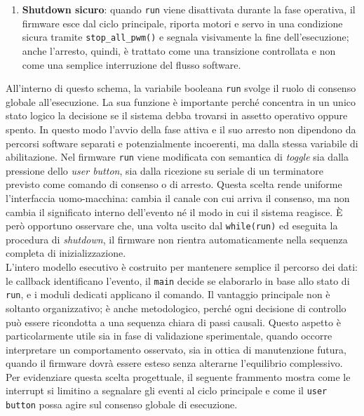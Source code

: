 \documentclass[11pt]{report}
\begin{document}
\begin{enumerate}
		\item \textbf{Shutdown sicuro}: quando \texttt{run} viene disattivata durante la fase operativa, il firmware esce dal ciclo principale, riporta motori e servo in una condizione sicura tramite \texttt{stop\_all\_pwm()} e segnala visivamente la fine dell'esecuzione; anche l'arresto, quindi, è trattato come una transizione controllata e non come una semplice interruzione del flusso software.
	\end{enumerate}
	
	All'interno di questo schema, la variabile booleana \texttt{run} svolge il ruolo di consenso globale all'esecuzione. La sua funzione è importante perché concentra in un unico stato logico la decisione se il sistema debba trovarsi in assetto operativo oppure spento. In questo modo l'avvio della fase attiva e il suo arresto non dipendono da percorsi software separati e potenzialmente incoerenti, ma dalla stessa variabile di abilitazione. Nel firmware \texttt{run} viene modificata con semantica di \textit{toggle} sia dalla pressione dello \textit{user button}, sia dalla ricezione su seriale di un terminatore previsto come comando di consenso o di arresto. Questa scelta rende uniforme l'interfaccia uomo-macchina: cambia il canale con cui arriva il consenso, ma non cambia il significato interno dell'evento né il modo in cui il sistema reagisce. È però opportuno osservare che, una volta uscito dal \texttt{while(run)} ed eseguita la procedura di \textit{shutdown}, il firmware non rientra automaticamente nella sequenza completa di inizializzazione.\\
	L'intero modello esecutivo è costruito per mantenere semplice il percorso dei dati: le callback identificano l'evento, il \texttt{main} decide se elaborarlo in base allo stato di \texttt{run}, e i moduli dedicati applicano il comando. Il vantaggio principale non è soltanto organizzativo; è anche metodologico, perché ogni decisione di controllo può essere ricondotta a una sequenza chiara di passi causali. Questo aspetto è particolarmente utile sia in fase di validazione sperimentale, quando occorre interpretare un comportamento osservato, sia in ottica di manutenzione futura, quando il firmware dovrà essere esteso senza alterarne l'equilibrio complessivo.\\
	Per evidenziare questa scelta progettuale, il seguente frammento mostra come le interrupt si limitino a segnalare gli eventi al ciclo principale e come il \texttt{user button} possa agire sul consenso globale di esecuzione.
	
\end{document}
